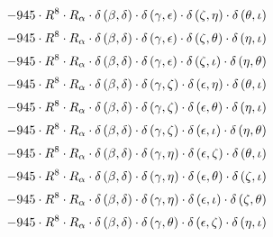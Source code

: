 \begin{subequations}
\begin{gather}
 \\[0.2em] \notag 		 - 945 \cdot R^{8} \cdot R_{\alpha{}} \cdot \delta{}\left(\beta{}, \delta{}\right) \cdot \delta{}\left(\gamma{}, \epsilon{}\right) \cdot \delta{}\left(\zeta{}, \eta{}\right) \cdot \delta{}\left(\theta{}, \iota{}\right) 
 \\[0.2em] \notag 		 - 945 \cdot R^{8} \cdot R_{\alpha{}} \cdot \delta{}\left(\beta{}, \delta{}\right) \cdot \delta{}\left(\gamma{}, \epsilon{}\right) \cdot \delta{}\left(\zeta{}, \theta{}\right) \cdot \delta{}\left(\eta{}, \iota{}\right) 
 \\[0.2em] \notag 		 - 945 \cdot R^{8} \cdot R_{\alpha{}} \cdot \delta{}\left(\beta{}, \delta{}\right) \cdot \delta{}\left(\gamma{}, \epsilon{}\right) \cdot \delta{}\left(\zeta{}, \iota{}\right) \cdot \delta{}\left(\eta{}, \theta{}\right) 
 \\[0.2em] \notag 		 - 945 \cdot R^{8} \cdot R_{\alpha{}} \cdot \delta{}\left(\beta{}, \delta{}\right) \cdot \delta{}\left(\gamma{}, \zeta{}\right) \cdot \delta{}\left(\epsilon{}, \eta{}\right) \cdot \delta{}\left(\theta{}, \iota{}\right) 
 \\[0.2em] \notag 		 - 945 \cdot R^{8} \cdot R_{\alpha{}} \cdot \delta{}\left(\beta{}, \delta{}\right) \cdot \delta{}\left(\gamma{}, \zeta{}\right) \cdot \delta{}\left(\epsilon{}, \theta{}\right) \cdot \delta{}\left(\eta{}, \iota{}\right) 
 \\[0.2em] \notag 		 - 945 \cdot R^{8} \cdot R_{\alpha{}} \cdot \delta{}\left(\beta{}, \delta{}\right) \cdot \delta{}\left(\gamma{}, \zeta{}\right) \cdot \delta{}\left(\epsilon{}, \iota{}\right) \cdot \delta{}\left(\eta{}, \theta{}\right) 
 \\[0.2em] \notag 		 - 945 \cdot R^{8} \cdot R_{\alpha{}} \cdot \delta{}\left(\beta{}, \delta{}\right) \cdot \delta{}\left(\gamma{}, \eta{}\right) \cdot \delta{}\left(\epsilon{}, \zeta{}\right) \cdot \delta{}\left(\theta{}, \iota{}\right) 
 \\[0.2em] \notag 		 - 945 \cdot R^{8} \cdot R_{\alpha{}} \cdot \delta{}\left(\beta{}, \delta{}\right) \cdot \delta{}\left(\gamma{}, \eta{}\right) \cdot \delta{}\left(\epsilon{}, \theta{}\right) \cdot \delta{}\left(\zeta{}, \iota{}\right) 
 \\[0.2em] \notag 		 - 945 \cdot R^{8} \cdot R_{\alpha{}} \cdot \delta{}\left(\beta{}, \delta{}\right) \cdot \delta{}\left(\gamma{}, \eta{}\right) \cdot \delta{}\left(\epsilon{}, \iota{}\right) \cdot \delta{}\left(\zeta{}, \theta{}\right) 
 \\[0.2em] \notag 		 - 945 \cdot R^{8} \cdot R_{\alpha{}} \cdot \delta{}\left(\beta{}, \delta{}\right) \cdot \delta{}\left(\gamma{}, \theta{}\right) \cdot \delta{}\left(\epsilon{}, \zeta{}\right) \cdot \delta{}\left(\eta{}, \iota{}\right) 

\end{gather}
\end{subequations}
